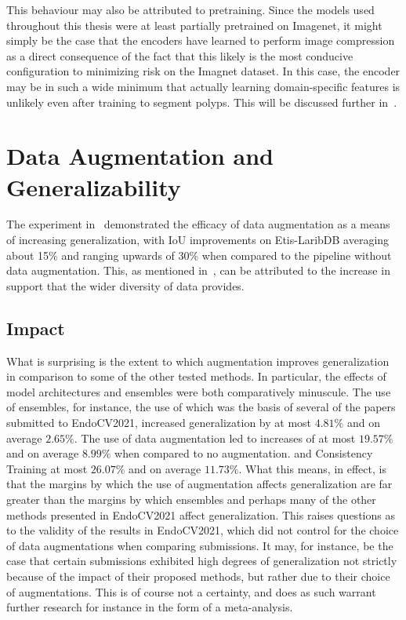 This behaviour may also be attributed to pretraining. Since the models used throughout this thesis were at least partially pretrained on Imagenet, it might simply be the case that the encoders have learned to perform image compression as a direct consequence of the fact that this likely is the most conducive configuration to minimizing risk on the Imagnet dataset. In this case, the encoder may be in such a wide minimum that actually learning domain-specific features is unlikely even after training to segment polyps. This will be discussed further in~.


\section{Data Augmentation and Generalizability}
The experiment in~ demonstrated the efficacy of data augmentation as a means of increasing generalization, with IoU improvements on Etis-LaribDB averaging about 15\% and ranging upwards of 30\% when compared to the pipeline without data augmentation. This, as mentioned in~, can be attributed to the increase in support that the wider diversity of data provides. 

\subsection{Impact}

What is surprising is the extent to which augmentation improves generalization in comparison to some of the other tested methods. In particular, the effects of model architectures and ensembles were both comparatively minuscule. The use of ensembles, for instance, the use of which was the basis of several of the papers submitted to EndoCV2021, increased generalization by at most \(4.81\%\) and on average \(2.65\%\).  The use of data augmentation led to increases of at most \(19.57 \%\) and on average \(8.99\%\) when compared to no augmentation. and Consistency Training at most \(26.07\%\) and on average \(11.73\%\). What this means, in effect, is that the margins by which the use of augmentation affects generalization are far greater than the margins by which ensembles and perhaps many of the other methods presented in EndoCV2021 affect generalization. This raises questions as to the validity of the results in EndoCV2021, which did not control for the choice of data augmentations when comparing submissions. It may, for instance, be the case that certain submissions exhibited high degrees of generalization not strictly because of the impact of their proposed methods, but rather due to their choice of augmentations. This is of course not a certainty, and does as such warrant further research for instance in the form of a meta-analysis. 

